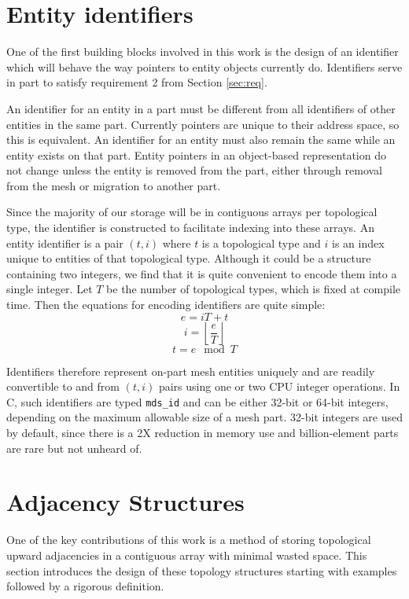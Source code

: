 \documentclass{article}
\begin{document}
\section{Entity identifiers}
\label{sec:id}

One of the first building blocks involved in this work
is the design of an identifier which will behave the way
pointers to entity objects currently do.
Identifiers serve in part to satisfy requirement 2 from
Section \ref{sec:req}.

An identifier for an entity in a part must be different
from all identifiers of other entities in the same part.
Currently pointers are unique to their address space, so
this is equivalent.
An identifier for an entity must also remain the same
while an entity exists on that part.
Entity pointers in an object-based representation do not
change unless the entity is removed from the part, either
through removal from the mesh or migration to another part.

Since the majority of our storage will be in contiguous
arrays per topological type, the identifier is constructed
to facilitate indexing into these arrays.
An entity identifier is a pair $(t,i)$ where $t$ is a topological
type and $i$ is an index unique to entities of that topological
type.
Although it could be a structure containing two integers, we
find that it is quite convenient to encode them into a single
integer.
Let $T$ be the number of topological types, which is fixed at
compile time.
Then the equations for encoding identifiers are quite simple:
\[e = iT + t\]
\[i = \left\lfloor \frac{e}{T} \right\rfloor\]
\[t = e \mod T\]

Identifiers therefore represent on-part mesh entities uniquely
and are readily convertible to and from $(t,i)$
pairs using one or two CPU integer operations.
In C, such identifiers are typed \texttt{mds\_id} and can
be either 32-bit or 64-bit integers, depending on the maximum
allowable size of a mesh part.
32-bit integers are used by default, since there is a 2X reduction
in memory use and billion-element parts are rare but not
unheard of.

\section{Adjacency Structures}
\label{sec:adj}

One of the key contributions of this work is a method of storing
topological upward adjacencies in a contiguous array with minimal
wasted space.
This section introduces the design of these topology structures
starting with examples followed by a rigorous definition.
\end{document}
